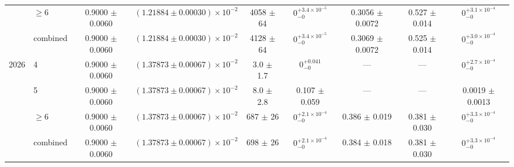 \begin{table}
\begin{tiny}
\begin{tabular}{llccccccc}
 & $\geq 6$ & 0.9000 $\pm$ 0.0060 & $(1.21884 \pm 0.00030) \times 10^{-2}$ & 4058 $\pm$ 64 & $0^{+3.4 \times 10^{-5}}_{-0}$ & 0.3056 $\pm$ 0.0072 & 0.527 $\pm$ 0.014 & $0^{+3.1 \times 10^{-4}}_{-0}$ \\
 & combined & 0.9000 $\pm$ 0.0060 & $(1.21884 \pm 0.00030) \times 10^{-2}$ & 4128 $\pm$ 64 & $0^{+3.4 \times 10^{-5}}_{-0}$ & 0.3069 $\pm$ 0.0072 & 0.525 $\pm$ 0.014 & $0^{+3.0 \times 10^{-4}}_{-0}$ \\
\hline
\multirow{4}{*}{2026} & 4 & 0.9000 $\pm$ 0.0060 & $(1.37873 \pm 0.00067) \times 10^{-2}$ & 3.0 $\pm$ 1.7 & $0^{+0.041}_{-0}$ & --- & --- & $0^{+2.7 \times 10^{-4}}_{-0}$ \\
 & 5 & 0.9000 $\pm$ 0.0060 & $(1.37873 \pm 0.00067) \times 10^{-2}$ & 8.0 $\pm$ 2.8 & 0.107 $\pm$ 0.059 & --- & --- & 0.0019 $\pm$ 0.0013 \\
 & $\geq 6$ & 0.9000 $\pm$ 0.0060 & $(1.37873 \pm 0.00067) \times 10^{-2}$ & 687 $\pm$ 26 & $0^{+2.1 \times 10^{-4}}_{-0}$ & 0.386 $\pm$ 0.019 & 0.381 $\pm$ 0.030 & $0^{+3.3 \times 10^{-4}}_{-0}$ \\
 & combined & 0.9000 $\pm$ 0.0060 & $(1.37873 \pm 0.00067) \times 10^{-2}$ & 698 $\pm$ 26 & $0^{+2.1 \times 10^{-4}}_{-0}$ & 0.384 $\pm$ 0.018 & 0.381 $\pm$ 0.030 & $0^{+3.3 \times 10^{-4}}_{-0}$ \\
\hline
\end{tabular}
\end{tiny}
\end{table}
